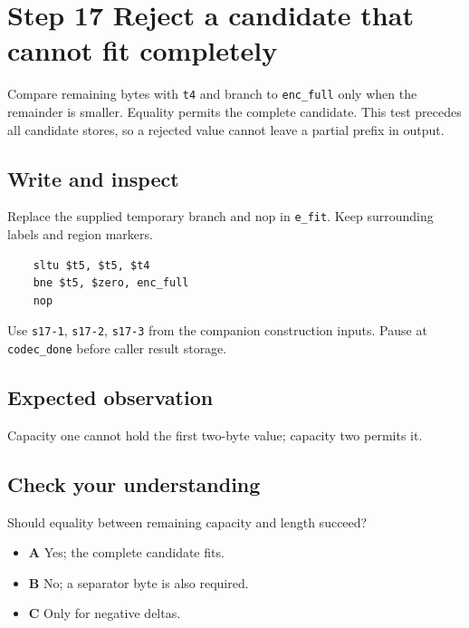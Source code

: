 \section{Step 17 Reject a candidate that cannot fit completely}\label{delta-s17}

Compare remaining bytes with \texttt{t4} and branch to \texttt{enc\_full} only when the remainder is smaller. Equality permits the complete candidate. This test precedes all candidate stores, so a rejected value cannot leave a partial prefix in output.

\subsection{Write and inspect}
Replace the supplied temporary branch and nop in \texttt{e\_fit}. Keep surrounding labels and region markers.

\begin{verbatim}
    sltu $t5, $t5, $t4
    bne $t5, $zero, enc_full
    nop
\end{verbatim}
Use \texttt{s17-1}, \texttt{s17-2}, \texttt{s17-3} from the companion construction inputs. Pause at \texttt{codec\_done} before caller result storage.

\subsection{Expected observation}
Capacity one cannot hold the first two-byte value; capacity two permits it.

\subsection{Check your understanding}
Should equality between remaining capacity and length succeed?

\begin{itemize}
  \item \textbf{A} Yes; the complete candidate fits.
  \item \textbf{B} No; a separator byte is also required.
  \item \textbf{C} Only for negative deltas.
\end{itemize}
